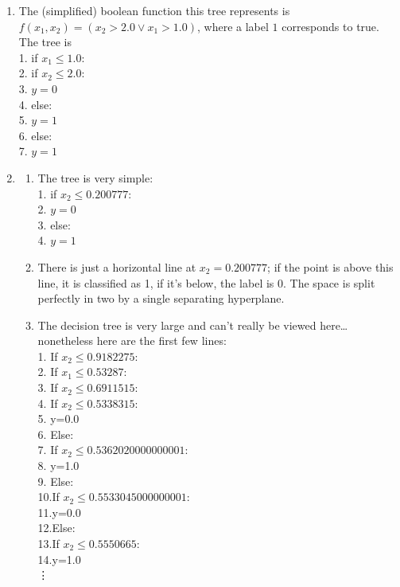 \documentclass[a4paper]{article}
\theoremstyle{definition}
\begin{document}
\begin{enumerate}
		\item The (simplified) boolean function this tree represents is $ f(x_1, x_2) = (x_2 > 2.0 \lor x_1> 1.0) $, where a label $ 1 $ corresponds to true. The tree is\\
		1. if $ x_1 \leq 1.0: $\\
		2. \qquad if $ x_2 \leq 2.0: $\\
		3. \qquad \qquad $ y=0 $\\
		4. \qquad else:\\
		5. \qquad\qquad $ y=1 $\\
		6. else:\\ 
		7. \qquad $ y=1 $ 
		
		\item \begin{enumerate}
			\item The tree is very simple:\\
			1. if $ x_2 \leq 0.200777: $\\
			2. \qquad $ y=0 $\\
			3. else:\\
			4. \qquad $ y=1 $
			
			\item There is just a horizontal line at $ x_2=0.200777 $; if the point is above this line, it is classified as 1, if it's below, the label is 0. The space is split perfectly in two by a single separating hyperplane.
			
			\item The decision tree is very large and can't really be viewed here\ldots nonetheless here are the first few lines:\\
			1. If $ x_2 \leq 0.9182275 $:\\
			2. \qquad If $ x_1 \leq 0.53287 $:\\
			3. \qquad \qquad If $ x_2 \leq 0.6911515 $:\\
			4. \qquad \qquad \qquad If $ x_2 \leq 0.5338315 $:\\
			5. \qquad \qquad \qquad \qquad y=0.0\\
			6. \qquad \qquad \qquad Else:\\
			7. \qquad \qquad \qquad \qquad If $ x_2 \leq 0.5362020000000001 $:\\
			8. \qquad \qquad \qquad \qquad \qquad y=1.0\\
			9. \qquad \qquad \qquad \qquad Else:\\
			10.\!\qquad \qquad \qquad \qquad \qquad If $ x_2 \leq 0.5533045000000001 $:\\
			11.\!\qquad \qquad \qquad \qquad \qquad \qquad y=0.0\\
			12.\!\qquad \qquad \qquad \qquad \qquad Else:\\
			13.\!\qquad \qquad \qquad \qquad \qquad \qquad If $ x_2 \leq 0.5550665 $:\\
			14.\!\qquad \qquad \qquad \qquad \qquad \qquad \qquad y=1.0\\
			\vdots
			

\end{enumerate}
\end{enumerate}
\end{document}
